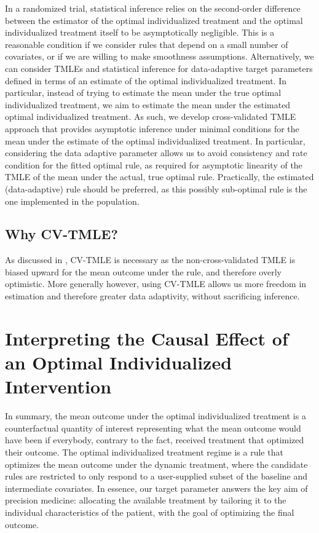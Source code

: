 \documentclass[12pt, krantz2,]{krantz}
\theoremstyle{definition}
\theoremstyle{definition}
\theoremstyle{definition}
\newcommand{\1}{\mathbbm{1}}
\begin{document}
In a randomized trial, statistical inference relies on the second-order
difference between the estimator of the optimal individualized treatment and the
optimal individualized treatment itself to be asymptotically negligible. This is
a reasonable condition if we consider rules that depend on a small number of
covariates, or if we are willing to make smoothness assumptions. Alternatively,
we can consider TMLEs and statistical inference for data-adaptive target
parameters defined in terms of an estimate of the optimal individualized
treatment. In particular, instead of trying to estimate the mean under the true
optimal individualized treatment, we aim to estimate the mean under the
estimated optimal individualized treatment. As such, we develop cross-validated
TMLE approach that provides asymptotic inference under minimal conditions for
the mean under the estimate of the optimal individualized treatment. In
particular, considering the data adaptive parameter allows us to avoid
consistency and rate condition for the fitted optimal rule, as required for
asymptotic linearity of the TMLE of the mean under the actual, true optimal
rule. Practically, the estimated (data-adaptive) rule should be preferred, as
this possibly sub-optimal rule is the one implemented in the population.

\hypertarget{why-cv-tmle}{%
\subsection{Why CV-TMLE?}\label{why-cv-tmle}}

As discussed in \citet{vanderLaanLuedtke15}, CV-TMLE is necessary as the
non-cross-validated TMLE is biased upward for the mean outcome under the rule,
and therefore overly optimistic. More generally however, using CV-TMLE allows us
more freedom in estimation and therefore greater data adaptivity, without
sacrificing inference.

\hypertarget{interpreting-the-causal-effect-of-an-optimal-individualized-intervention}{%
\section{Interpreting the Causal Effect of an Optimal Individualized Intervention}\label{interpreting-the-causal-effect-of-an-optimal-individualized-intervention}}

In summary, the mean outcome under the optimal individualized treatment is a
counterfactual quantity of interest representing what the mean outcome would
have been if everybody, contrary to the fact, received treatment that optimized
their outcome. The optimal individualized treatment regime is a rule that
optimizes the mean outcome under the dynamic treatment, where the candidate
rules are restricted to only respond to a user-supplied subset of the baseline
and intermediate covariates. In essence, our target parameter answers the key
aim of precision medicine: allocating the available treatment by tailoring it to
the individual characteristics of the patient, with the goal of optimizing the
final outcome.
\end{document}
